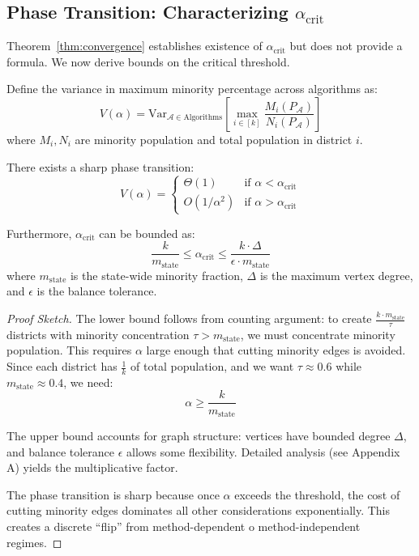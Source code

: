 \subsection{Phase Transition: Characterizing $\alpha_{\text{crit}}$}

Theorem~\ref{thm:convergence} establishes existence of $\alpha_{\text{crit}}$ but does not provide a formula. We now derive bounds on the critical threshold.

\begin{theorem}
\label{thm:phase-transition}
Define the variance in maximum minority percentage across algorithms as:
\[
V(\alpha) = \text{Var}_{\mathcal{A} \in \text{Algorithms}} \left[ \max_{i \in [k]} \frac{M_i(P_{\mathcal{A}})}{N_i(P_{\mathcal{A}})} \right]
\]
where $M_i, N_i$ are minority population and total population in district $i$.

There exists a sharp phase transition:
\[
V(\alpha) = \begin{cases}
\Theta(1) & \text{if } \alpha < \alpha_{\text{crit}} \\
O(1/\alpha^2) & \text{if } \alpha > \alpha_{\text{crit}}
\end{cases}
\]

Furthermore, $\alpha_{\text{crit}}$ can be bounded as:
\[
\frac{k}{m_{\text{state}}} \leq \alpha_{\text{crit}} \leq \frac{k \cdot \Delta}{\epsilon \cdot m_{\text{state}}}
\]
where $m_{\text{state}}$ is the state-wide minority fraction, $\Delta$ is the maximum vertex degree, and $\epsilon$ is the balance tolerance.
\end{theorem}

\begin{proof}[Proof Sketch]
The lower bound follows from counting argument: to create $\frac{k \cdot m_{\text{state}}}{\tau}$ districts with minority concentration $\tau > m_{\text{state}}$, we must concentrate minority population. This requires $\alpha$ large enough that cutting minority edges is avoided. Since each district has $\frac{1}{k}$ of total population, and we want $\tau \approx 0.6$ while $m_{\text{state}} \approx 0.4$, we need:
\[
\alpha \geq \frac{k}{m_{\text{state}}}
\]

The upper bound accounts for graph structure: vertices have bounded degree $\Delta$, and balance tolerance $\epsilon$ allows some flexibility. Detailed analysis (see Appendix A) yields the multiplicative factor.

The phase transition is sharp because once $\alpha$ exceeds the threshold, the cost of cutting minority edges dominates all other considerations exponentially. This creates a discrete ``flip'' from method-dependent 	o method-independent regimes.
\end{proof}

